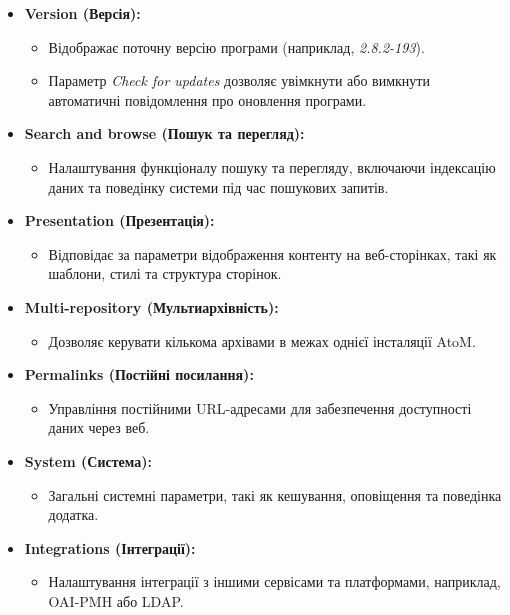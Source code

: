 \documentclass[14pt,a4paper]{article}
\begin{document}
\begin{large}
\begin{itemize}
    \item \textbf{Version (Версія):}
        \begin{itemize}
            \item Відображає поточну версію програми (наприклад, \textit{2.8.2-193}).
            \item Параметр \textit{Check for updates} дозволяє увімкнути або вимкнути автоматичні повідомлення про оновлення програми.
        \end{itemize}
    \item \textbf{Search and browse (Пошук та перегляд):}
        \begin{itemize}
            \item Налаштування функціоналу пошуку та перегляду, включаючи індексацію даних та поведінку системи під час пошукових запитів.
        \end{itemize}
    \item \textbf{Presentation (Презентація):}
        \begin{itemize}
            \item Відповідає за параметри відображення контенту на веб-сторінках, такі як шаблони, стилі та структура сторінок.
        \end{itemize}
    \item \textbf{Multi-repository (Мультиархівність):}
        \begin{itemize}
            \item Дозволяє керувати кількома архівами в межах однієї інсталяції AtoM.
        \end{itemize}
    \item \textbf{Permalinks (Постійні посилання):}
        \begin{itemize}
            \item Управління постійними URL-адресами для забезпечення доступності даних через веб.
        \end{itemize}
    \item \textbf{System (Система):}
        \begin{itemize}
            \item Загальні системні параметри, такі як кешування, оповіщення та поведінка додатка.
        \end{itemize}
    \item \textbf{Integrations (Інтеграції):}
        \begin{itemize}
            \item Налаштування інтеграції з іншими сервісами та платформами, наприклад, OAI-PMH або LDAP.
        \end{itemize}
\end{itemize}



\end{large}
\end{document}
